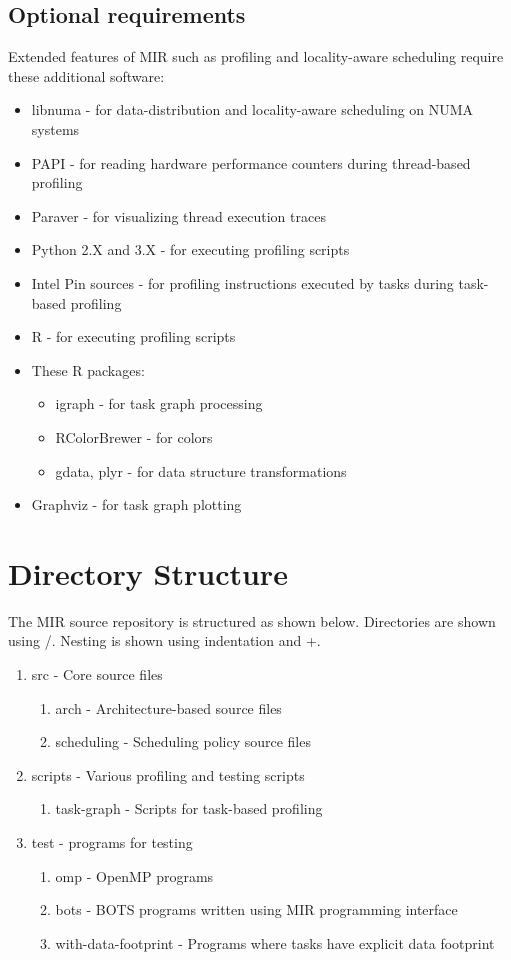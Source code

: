 \documentclass[11pt,a4paper,notitlepage]{article}
\begin{document}
\subsection{Optional requirements}
Extended features of MIR such as profiling and locality-aware scheduling require these additional software:
\begin{itemize}
\item libnuma - for data-distribution and locality-aware scheduling on NUMA systems
\item PAPI - for reading hardware performance counters during thread-based profiling
\item Paraver - for visualizing thread execution traces
\item Python 2.X and 3.X - for executing profiling scripts
\item Intel Pin sources - for profiling instructions executed by tasks during task-based profiling
\item R - for executing profiling scripts
\item These R packages: 
\begin{itemize}
\item igraph - for task graph processing
\item RColorBrewer - for colors
\item gdata, plyr - for data structure transformations
\end{itemize}
\item Graphviz - for task graph plotting
\end{itemize}

\section{Directory Structure}
The MIR source repository is structured as shown below. Directories are shown using /. Nesting is shown using indentation and +.
\begin{enumerate}[/]
\item src - Core source files
    \begin{enumerate}[+/]
        \item arch - Architecture-based source files
        \item scheduling - Scheduling policy source files
    \end{enumerate}
\item scripts - Various profiling and testing scripts
    \begin{enumerate}[+/]
        \item task-graph - Scripts for task-based profiling
    \end{enumerate}
\item test - programs for testing 
    \begin{enumerate}[+/]
        \item omp - OpenMP programs
        \item bots - BOTS programs written using MIR programming interface
        \item with-data-footprint - Programs where tasks have explicit data footprint 
    \end{enumerate}
\end{enumerate}
\end{document}

